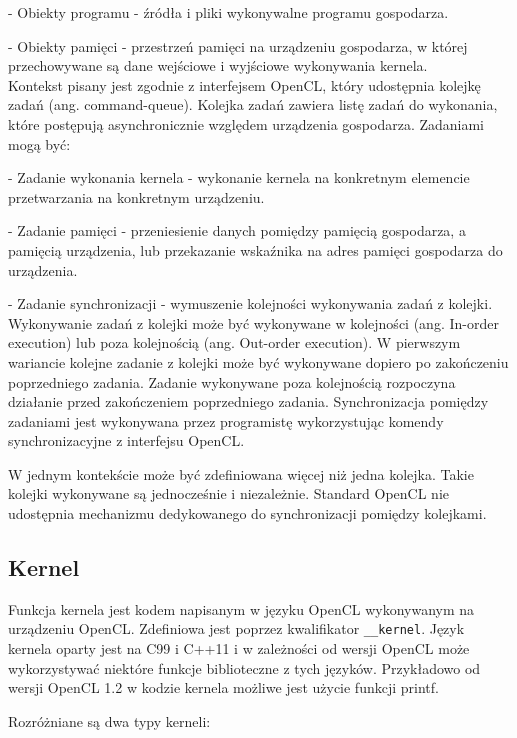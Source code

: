 - Obiekty programu - źródła i pliki wykonywalne programu gospodarza.

- Obiekty pamięci - przestrzeń pamięci na urządzeniu gospodarza, w której przechowywane są dane wejściowe i wyjściowe wykonywania kernela.\\

Kontekst pisany jest zgodnie z interfejsem OpenCL, który udostępnia kolejkę zadań (ang. command-queue). Kolejka zadań zawiera listę zadań do wykonania, które postępują asynchronicznie względem urządzenia gospodarza. Zadaniami mogą być:

- Zadanie wykonania kernela - wykonanie kernela na konkretnym elemencie przetwarzania na konkretnym urządzeniu.

- Zadanie pamięci - przeniesienie danych pomiędzy pamięcią gospodarza, a pamięcią urządzenia, lub przekazanie wskaźnika na adres pamięci gospodarza do urządzenia.

- Zadanie synchronizacji - wymuszenie kolejności wykonywania zadań z kolejki.\\

Wykonywanie zadań z kolejki może być wykonywane w kolejności (ang. In-order execution) lub poza kolejnością (ang. Out-order execution). W pierwszym wariancie kolejne zadanie z kolejki może być wykonywane dopiero po zakończeniu poprzedniego zadania. Zadanie wykonywane poza kolejnością rozpoczyna działanie przed zakończeniem poprzedniego zadania. Synchronizacja pomiędzy zadaniami jest wykonywana przez programistę wykorzystując komendy synchronizacyjne z interfejsu OpenCL.

W jednym kontekście może być zdefiniowana więcej niż jedna kolejka. Takie kolejki wykonywane są jednocześnie i niezależnie. Standard OpenCL nie udostępnia mechanizmu dedykowanego do synchronizacji pomiędzy kolejkami.


\subsection{Kernel}\label{sec:OpenC4L}

Funkcja kernela jest kodem napisanym w języku OpenCL wykonywanym na urządzeniu OpenCL. Zdefiniowa jest poprzez kwalifikator \verb|__kernel|. Język kernela oparty jest na C99 i C++11 i w zależności od wersji OpenCL może wykorzystywać niektóre funkcje biblioteczne z tych języków. Przykładowo od wersji OpenCL 1.2 w kodzie kernela możliwe jest użycie funkcji printf.

Rozróżniane są dwa typy kerneli:


